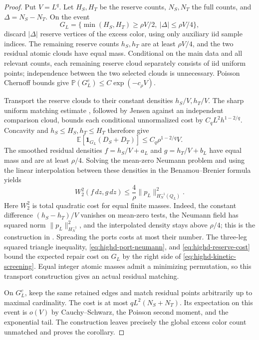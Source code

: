 \documentclass[11pt,reqno]{amsart}
\theoremstyle{definition}
\theoremstyle{remark}
\numberwithin{equation}{section}
\newcommand{\E}{\mathbb E}
\newcommand{\Pp}{\mathbb P}
\begin{document}
\begin{proof}
Put \(V=L^q\). Let \(H_S,H_T\) be the reserve counts, \(N_S,N_T\)
the full counts, and \(\Delta=N_S-N_T\). On the event
\[
 G_L=\{\min(H_S,H_T)\ge\rho V/2,\ |\Delta|\le\rho V/4\},
\]
discard \(|\Delta|\) reserve vertices of the excess color, using only
auxiliary iid sample indices. The remaining reserve counts \(h_S,h_T\)
are at least \(\rho V/4\), and the two residual atomic clouds have
equal mass. Conditional on the main data and all relevant counts, each
remaining reserve cloud separately consists of iid uniform points;
independence between the two selected clouds is unnecessary. Poisson
Chernoff bounds give
\(\Pp(G_L^c)\le C\exp(-c_\rho V)\).

Transport the reserve clouds to their constant densities
\(h_S/V,h_T/V\). The sharp uniform matching estimate
\cite[Theorem~1.1]{GoldmanTrevisan2021}, followed by Jensen against an
independent comparison cloud, bounds each conditional unnormalized
cost by \(C_qL^2h^{1-2/q}\). Concavity and \(h_S\le H_S,h_T\le H_T\)
therefore give
\begin{equation}
\label{eq:highd-reserve-cost}
 \E[\mathbf1_{G_L}(D_S+D_T)]\le C_q\rho^{1-2/q}V.
\end{equation}
The smoothed residual densities
\(f=h_S/V+a_L\) and \(g=h_T/V+b_L\) have equal mass and are at
least \(\rho/4\). Solving the mean-zero Neumann problem and using
the linear interpolation between these densities in the
Benamou--Brenier formula yields
\[
 W_2^2(f\,dz,g\,dz)
 \le\frac4\rho\|p_L\|_{H_N^{-1}(Q_L)}^2.
\]
Here \(W_2^2\) is total quadratic cost for equal finite masses.
Indeed, the constant difference \((h_S-h_T)/V\) vanishes on mean-zero
tests, the Neumann field has squared norm \(\|p_L\|_{H_N^{-1}}^2\),
and the interpolated density stays above \(\rho/4\); this is the
construction in \cite[proof of Lemma~3.4]{GoldmanTrevisan2021}.
Spreading the ports costs at most their number. The three-leg squared
triangle inequality, \eqref{eq:highd-port-neumann}, and
\eqref{eq:highd-reserve-cost} bound the expected repair cost on \(G_L\)
by the right side of \eqref{eq:highd-kinetic-screening}. Equal integer
atomic masses admit a minimizing permutation, so this transport
construction gives an actual residual matching.

On \(G_L^c\), keep the same retained edges and match residual points
arbitrarily up to maximal cardinality. The cost is at most
\(qL^2(N_S+N_T)\). Its expectation on this event is \(o(V)\) by
Cauchy--Schwarz, the Poisson second moment, and the exponential tail.
The construction leaves precisely the global excess color count
unmatched and proves the corollary.
\end{proof}
\end{document}

